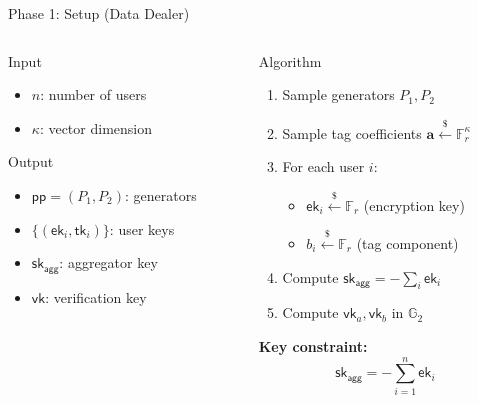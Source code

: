 \documentclass[aspectratio=169,10pt]{beamer}
\newcommand{\G}{\mathbb{G}}
\newcommand{\F}{\mathbb{F}}
\begin{document}
\begin{frame}{Phase 1: Setup (Data Dealer)}
    \begin{columns}[T]
        \begin{column}{0.48\textwidth}
            \begin{alertblock}{Input}
                \begin{itemize}
                    \item $n$: number of users
                    \item $\kappa$: vector dimension
                \end{itemize}
            \end{alertblock}

            \begin{exampleblock}{Output}
                \begin{itemize}
                    \item $\mathsf{pp} = (P_1, P_2)$: generators
                    \item $\{(\mathsf{ek}_i, \mathsf{tk}_i)\}$: user keys
                    \item $\mathsf{sk}_{\mathsf{agg}}$: aggregator key
                    \item $\mathsf{vk}$: verification key
                \end{itemize}
            \end{exampleblock}
        \end{column}
        \begin{column}{0.48\textwidth}
            \begin{block}{Algorithm}
                \begin{enumerate}
                    \item Sample generators $P_1, P_2$
                    \item Sample tag coefficients $\mathbf{a} \xleftarrow{\$} \F_r^\kappa$
                    \item For each user $i$:
                    \begin{itemize}
                        \item $\mathsf{ek}_i \xleftarrow{\$} \F_r$ (encryption key)
                        \item $b_i \xleftarrow{\$} \F_r$ (tag component)
                    \end{itemize}
                    \item Compute $\mathsf{sk}_{\mathsf{agg}} = -\sum_{i} \mathsf{ek}_i$
                    \item Compute $\mathsf{vk}_a, \mathsf{vk}_b$ in $\G_2$
                \end{enumerate}
            \end{block}

            \textbf{Key constraint:}
            \[
            \boxed{\mathsf{sk}_{\mathsf{agg}} = -\sum_{i=1}^n \mathsf{ek}_i}
            \]
        \end{column}
    \end{columns}
\end{frame}
\end{document}
